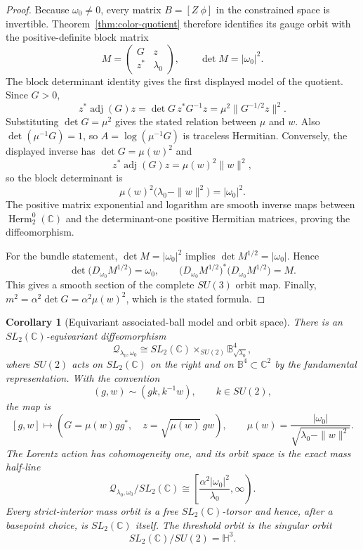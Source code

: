 \documentclass[11pt]{article}
\newtheorem{corollary}[theorem]{Corollary}
\theoremstyle{definition}
\newcommand{\C}{\mathbb C}
\newcommand{\Herm}{\operatorname{Herm}}
\newcommand{\adj}{\operatorname{adj}}
\newcommand{\cQ}{\mathscr Q}
\begin{document}
\begin{proof}
Because $\omega_0\neq0$, every matrix $B=[Z\ \phi]$ in the constrained
space is invertible.  Theorem~\ref{thm:color-quotient} therefore identifies
its gauge orbit with the positive-definite block matrix
\[
 M=\begin{pmatrix}G&z\\z^*&\lambda_0\end{pmatrix},
 \qquad
 \det M=|\omega_0|^2.
\]
The block determinant identity gives the first displayed model of the
quotient.  Since $G>0$,
\[
 z^*\adj(G)z
 =\det G\,z^*G^{-1}z
 =\mu^2\|G^{-1/2}z\|^2.
\]
Substituting $\det G=\mu^2$ gives the stated relation between $\mu$ and $w$.
Also $\det(\mu^{-1}G)=1$, so $A=\log(\mu^{-1}G)$ is traceless Hermitian.
Conversely, the displayed inverse has $\det G=\mu(w)^2$ and
\[
 z^*\adj(G)z=\mu(w)^2\|w\|^2,
\]
so the block determinant is
\[
 \mu(w)^2\bigl(\lambda_0-\|w\|^2\bigr)=|\omega_0|^2.
\]
The positive matrix exponential and logarithm are smooth inverse maps between
$\Herm_2^0(\C)$ and the determinant-one positive Hermitian matrices, proving
the diffeomorphism.

For the bundle statement, $\det M=|\omega_0|^2$ implies
$\det M^{1/2}=|\omega_0|$.  Hence
\[
 \det\bigl(D_{\omega_0}M^{1/2}\bigr)=\omega_0,
 \qquad
 \bigl(D_{\omega_0}M^{1/2}\bigr)^*
 \bigl(D_{\omega_0}M^{1/2}\bigr)=M.
\]
This gives a smooth section of the complete $SU(3)$ orbit map.  Finally,
$m^2=\alpha^2\det G=\alpha^2\mu(w)^2$, which is the stated formula.
\end{proof}

\begin{corollary}[Equivariant associated-ball model and orbit space]\label{cor:associated-ball}
There is an $SL_2(\C)$-equivariant diffeomorphism
\[
 \boxed{
 \cQ_{\lambda_0,\omega_0}
 \cong
 SL_2(\C)\times_{SU(2)}
 \mathbb B^4_{\sqrt{\lambda_0}},}
\]
where $SU(2)$ acts on $SL_2(\C)$ on the right and on
$\mathbb B^4\subset\C^2$ by the fundamental representation.  With the
convention
\[
 (g,w)\sim(gk,k^{-1}w),\qquad k\in SU(2),
\]
the map is
\[
 \boxed{
 [g,w]\longmapsto
 \left(
 G=\mu(w)gg^*,\quad
 z=\sqrt{\mu(w)}\,gw
 \right),
 \qquad
 \mu(w)=\frac{|\omega_0|}
 {\sqrt{\lambda_0-\|w\|^2}}.}
\]
The Lorentz action has cohomogeneity one, and its orbit space is the exact
mass half-line
\[
 \boxed{
 \cQ_{\lambda_0,\omega_0}/SL_2(\C)
 \cong
 \left[
 \frac{\alpha^2|\omega_0|^2}{\lambda_0},\infty
 \right).}
\]
Every strict-interior mass orbit is a free $SL_2(\C)$-torsor and hence, after
a basepoint choice, is $SL_2(\C)$ itself.  The threshold orbit is the singular
orbit
\[
 SL_2(\C)/SU(2)=\mathbb H^3.
\]
\end{corollary}
\end{document}
